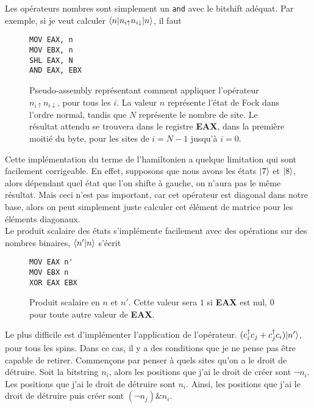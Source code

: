 \documentclass{subfiles}[../main.tex]
\begin{document}
                Les opérateurs nombres sont simplement un \texttt{and} avec
                le bitshift adéquat. Par exemple, si je veut calculer
                $\langle{n}|n_{i\uparrow}n_{i\downarrow}|{n}\rangle$, il faut
                \begin{figure}[H]
                \begin{verbatim}
MOV EAX, n
MOV EBX, n
SHL EAX, N
AND EAX, EBX
                \end{verbatim}
                    \caption{Pseudo-assembly représentant comment appliquer
                    l'opérateur $n_{i\uparrow}n_{i\downarrow}$, pour tous les
                    $i$. La valeur $n$ représente l'état de Fock dans l'ordre
                    normal, tandis que $N$ représente le nombre de site. Le
                    résultat attendu se trouvera dans le registre \textbf{EAX},
                    dans la première moitié du byte,
                    pour les sites de $i=N-1$ jusqu'à $i=0$.}
                \end{figure}
                Cette implémentation du terme de l'hamiltonien a quelque
                limitation qui sont facilement corrigeable. En effet, supposons
                que nous avons les états $|{7}\rangle$ et $|{8}\rangle$, alors dépendant
                quel état que l'on shifte à gauche, on n'aura pas le même résultat.
                Mais ceci n'est pas important, car cet opérateur est diagonal
                dans notre base, alors on peut simplement juste calculer cet
                élément de matrice pour les éléments diagonaux.\\
                Le produit scalaire des états s'implémente facilement avec des
                opérations sur des nombres binaires, $\langle{n'}|{n}\rangle$ s'écrit
                \begin{figure}[H]
                \begin{verbatim}
MOV EAX n'
MOV EBX n
XOR EAX EBX
                \end{verbatim}
                    \caption{Produit scalaire en $n$ et $n'$. Cette valeur sera
                    $1$ si \textbf{EAX} est nul, $0$ pour toute autre valeur de
                    \textbf{EAX}.}
                \end{figure}
                Le plus difficile est d'implémenter l'application de l'opérateur.
                $(c^\dagger_ic_j+c^\dagger_jc_i)|{n'}\rangle$, pour tous les spins. Dans ce
                cas, il y a des conditions que je ne pense pas être capable de
                retirer.
                Commençons par penser à quels sites qu'on a le droit de détruire.
                Soit la bitstring $n_i$, alors les positions que j'ai le droit
                de créer sont $\neg n_i$. Les positions que j'ai le droit de
                détruire sont $n_i$. Ainsi, les positions que j'ai le droit
                de détruire puis créer sont $(\neg n_j)\&n_i$.

\end{document}
